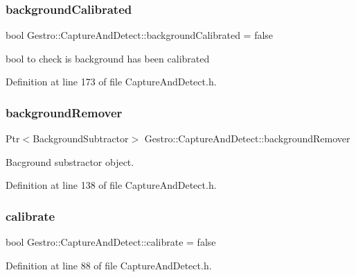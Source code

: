 \subsubsection{\texorpdfstring{background\+Calibrated}{backgroundCalibrated}}
{\footnotesize\ttfamily bool Gestro\+::\+Capture\+And\+Detect\+::background\+Calibrated = false\hspace{0.3cm}{\ttfamily [private]}}



bool to check is background has been calibrated 



Definition at line 173 of file Capture\+And\+Detect.\+h.

\mbox{\label{class_gestro_1_1_capture_and_detect_a83873f62b771ca924cf39ee7e8e8eb80}} 
\subsubsection{\texorpdfstring{background\+Remover}{backgroundRemover}}
{\footnotesize\ttfamily Ptr$<$Background\+Subtractor$>$ Gestro\+::\+Capture\+And\+Detect\+::background\+Remover\hspace{0.3cm}{\ttfamily [private]}}



Bacground substractor object. 



Definition at line 138 of file Capture\+And\+Detect.\+h.

\mbox{\label{class_gestro_1_1_capture_and_detect_acbe1ce90cb6a7bad1c94a6be68cc4f0b}} 
\subsubsection{\texorpdfstring{calibrate}{calibrate}}
{\footnotesize\ttfamily bool Gestro\+::\+Capture\+And\+Detect\+::calibrate = false}



Definition at line 88 of file Capture\+And\+Detect.\+h.

